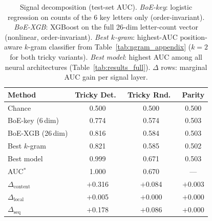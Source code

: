 \documentclass{article}
\theoremstyle{plain}
\theoremstyle{definition}
\theoremstyle{remark}
\begin{document}
\begin{table}[h!]
\centering
\small
\caption{Signal decomposition (test-set AUC). \emph{BoE-key}: logistic regression on counts of the 6 key letters only (order-invariant). \emph{BoE-XGB}: XGBoost on the full 26-dim letter-count vector (nonlinear, order-invariant). \emph{Best $k$-gram}: highest-AUC position-aware $k$-gram classifier from Table~\ref{tab:ngram_appendix} ($k{=}2$ for both tricky variants). \emph{Best model}: highest AUC among all neural architectures (Table~\ref{tab:results_full}). $\Delta$ rows: marginal AUC gain per signal layer.}
\label{tab:signal_decomposition}
\begin{tabular}{l c c c}
\toprule
Method & Tricky Det.\ & Tricky Rnd.\ & Parity \\
\midrule
Chance & 0.500 & 0.500 & 0.500 \\
BoE-key (6\,dim) & 0.774 & 0.574 & 0.503 \\
BoE-XGB (26\,dim) & 0.816 & 0.584 & 0.503 \\
Best $k$-gram & 0.821 & 0.585 & 0.502 \\
Best model & 0.999 & 0.671 & 0.503 \\
\midrule
AUC$^*$ & 1.000 & 0.670 & --- \\
\midrule
$\Delta_{\text{content}}$ & $+$0.316 & $+$0.084 & $+$0.003 \\
$\Delta_{\text{local}}$ & $+$0.005 & $+$0.000 & $+$0.000 \\
$\Delta_{\text{seq}}$ & $+$0.178 & $+$0.086 & $+$0.000 \\
\bottomrule
\end{tabular}
\end{table}
\end{document}
